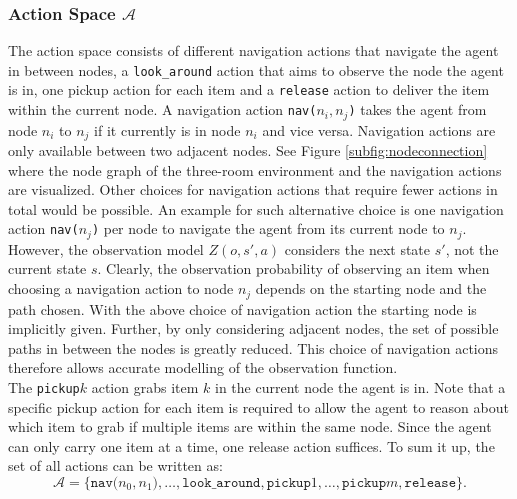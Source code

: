 \subsubsection{Action Space $\mathcal{A}$}
The action space consists of different navigation actions that navigate the agent in between nodes, a \texttt{look\_around} action that aims to observe the node the agent is in, one pickup action for each item and a \texttt{release} action to deliver the item within the current node. A navigation action \texttt{nav($n_i, n_j$)} takes the agent from node $n_i$ to $n_j$ if it currently is in node $n_i$ and vice versa. Navigation actions are only available between two adjacent nodes. See Figure \ref{subfig:nodeconnection} where the node graph of the three-room environment and the navigation actions are visualized. Other choices for navigation actions that require fewer actions in total would be possible. An example for such alternative choice is one navigation action \texttt{nav($n_j$)} per node to navigate the agent from its current node to $n_j$. However, the observation model $Z(o, s', a)$ considers the next state $s'$, not the current state $s$. Clearly, the observation probability of observing an item when choosing a navigation action to node $n_j$ depends on the starting node and the path chosen. With the above choice of navigation action the starting node is implicitly given. Further, by only considering adjacent nodes, the set of possible paths in between the nodes is greatly reduced. This choice of navigation actions therefore allows accurate modelling of the observation function.\\

The \texttt{pickup$k$} action grabs item $k$ in the current node the agent is in. Note that a specific pickup action for each item is required to allow the agent to reason about which item to grab if multiple items are within the same node. Since the agent can only carry one item at a time, one release action suffices. To sum it up, the set of all actions can be written as:
\begin{equation}
    \mathcal{A} = \{\texttt{nav($n_0, n_1$)}, \ldots, \texttt{look\_around}, \texttt{pickup$1$}, \ldots, \texttt{pickup$m$}, \texttt{release}\}.
\end{equation}
